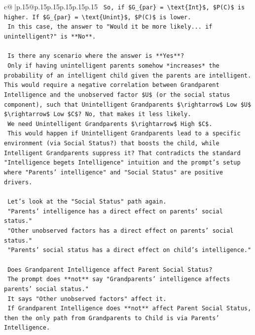\documentclass{article}
\begin{document}
{\begin{supertabular}{c@{$\;$}|p{.15\linewidth}@{}p{.15\linewidth}p{.15\linewidth}p{.15\linewidth}p{.15\linewidth}p{.15\linewidth}}
{{{\texttt{    So, if \$G\_\{par\} = \textbackslash{}text\{Int\}\$, \$P(C)\$ is higher. If \$G\_\{par\} = \textbackslash{}text\{Unint\}\$, \$P(C)\$ is lower.} \\
\texttt{    In this case, the answer to "Would it be more likely... if unintelligent?" is **No**.} \\
\\ 
\texttt{    Is there any scenario where the answer is **Yes**?} \\
\texttt{    Only if having unintelligent parents somehow *increases* the probability of an intelligent child given the parents are intelligent. This would require a negative correlation between Grandparent Intelligence and the unobserved factor \$U\$ (or the social status component), such that Unintelligent Grandparents \$\textbackslash{}rightarrow\$ Low \$U\$ \$\textbackslash{}rightarrow\$ Low \$C\$? No, that makes it less likely.} \\
\texttt{    We need Unintelligent Grandparents \$\textbackslash{}rightarrow\$ High \$C\$.} \\
\texttt{    This would happen if Unintelligent Grandparents lead to a specific environment (via Social Status?) that boosts the child, while Intelligent Grandparents suppress it? That contradicts the standard "Intelligence begets Intelligence" intuition and the prompt's setup where "Parents' intelligence" and "Social Status" are positive drivers.} \\
\\ 
\texttt{    Let's look at the "Social Status" path again.} \\
\texttt{    "Parents' intelligence has a direct effect on parents' social status."} \\
\texttt{    "Other unobserved factors has a direct effect on parents' social status."} \\
\texttt{    "Parents' social status has a direct effect on child's intelligence."} \\
\\ 
\texttt{    Does Grandparent Intelligence affect Parent Social Status?} \\
\texttt{    The prompt does **not** say "Grandparents' intelligence affects parents' social status."} \\
\texttt{    It says "Other unobserved factors" affect it.} \\
\texttt{    If Grandparent Intelligence does **not** affect Parent Social Status, then the only path from Grandparents to Child is via Parents' Intelligence.} \\
}}}
\end{supertabular}}
\end{document}
